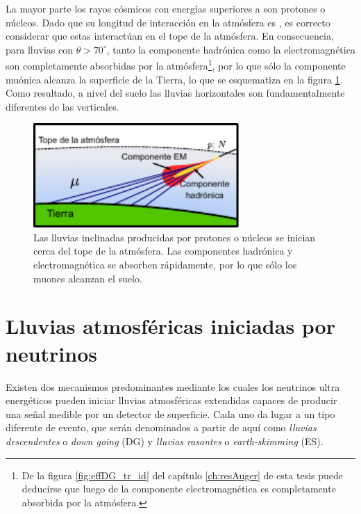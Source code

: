 La mayor parte los rayos cósmicos con energías superiores a  son protones o n\'ucleos.
Dado que su longitud de interacción en la atmósfera es , es correcto considerar que estas interact\'uan en el tope de la atmósfera.
En consecuencia, para lluvias con $\theta>70^\circ$, tanto la componente hadrónica como la electromagnética son completamente absorbidas por la atmósfera\footnote{De la figura \ref{fig:effDG_tr_id} del cap\'itulo \ref{ch:resAuger} de esta tesis puede deducirse que luego de  la componente electromagn\'etica es completamente absorbida por la atm\'osfera.}, por lo que sólo la componente muónica alcanza la superficie de la Tierra, lo que se esquematiza en la figura \ref{fig:horizontalHad}.
Como resultado, a nivel del suelo las lluvias horizontales son fundamentalmente diferentes de las verticales.
%
\begin{figure}[h!]
\begin{center}
\includegraphics[width=0.7\textwidth]{fig/EASAuger/horizontal2_english.pdf}
\caption{Las lluvias inclinadas producidas por protones o n\'ucleos se inician cerca del tope de la atmósfera.
Las componentes hadrónica y electromagnética se absorben rápidamente, por lo que sólo los muones alcanzan el suelo.
}
\label{fig:horizontalHad}
\end{center}
\end{figure}

\section{Lluvias atmosf\'ericas iniciadas por neutrinos}
\label{sc:easNu}

Existen dos mecanismos predominantes mediante los cuales los neutrinos ultra energ\'eticos pueden iniciar lluvias atmosféricas extendidas capaces de producir una se\~nal medible por un detector de superficie.
Cada uno da lugar a un tipo diferente de evento, que ser\'an denominados a partir de aqu\'i como \emph{lluvias descendentes} o \emph{down going} (DG) y \emph{lluvias rasantes} o \emph{earth-skimming} (ES).

